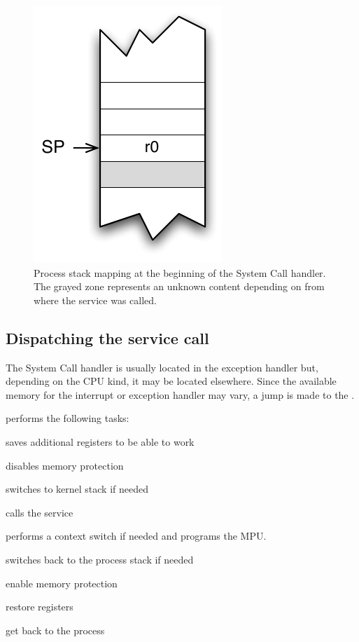 \begin{figure}[htbp] %
\begin{minipage}{0.5\textwidth}
    \centering
  \includegraphics[scale=.6]{pictures/PStackAfterInvoque} 
\end{minipage}
\begin{minipage}{0.5\textwidth}
   \caption{Process stack mapping at the beginning of the System Call handler. The grayed zone represents an unknown content depending on from where the service was called.}\label{fig:stackbeginningSC}
\end{minipage}
\end{figure}

\subsection{Dispatching the service call}

The System Call handler is usually located in the  exception handler but, depending on the CPU kind, it may be located elsewhere. Since the available memory for the interrupt or exception handler may vary, a jump is made to the .%

%

 performs the following tasks:
\begin{penum}
\item saves additional registers to be able to work
\item disables memory protection
\item switches to kernel stack if needed
\item calls the service
\item performs a context switch if needed and programs the MPU.
\item switches back to the process stack if needed
\item enable memory protection
\item restore registers
\item get back to the process
\end{penum}


